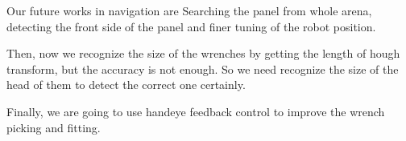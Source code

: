 Our future works in navigation are Searching the panel from whole arena,
detecting the front side of the panel and finer tuning of the robot position.

Then, now we recognize the size of the wrenches by getting the length of hough transform, but the accuracy is not enough.
So we need recognize the size of the head of them to detect the correct one certainly.

Finally, we are going to use handeye feedback control to improve the wrench picking and fitting.
